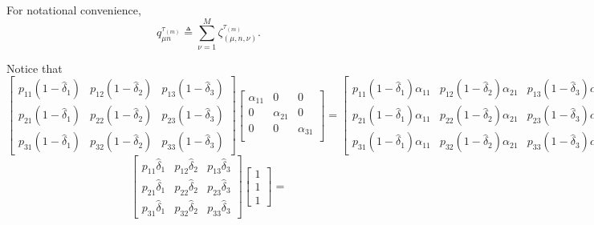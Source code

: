 \documentclass[journal,twoside,web]{ieeecolor}
\begin{document}
\begin{figure*}[ht]
\raggedright
For notational convenience, 
\begin{equation}
    q_{\mu n}^{\tau_{(m)}} \triangleq \sum_{\nu=1}^{M} \zeta_{(\mu,n,\nu)}^{\tau_{(m)}}.
\end{equation}
\end{figure*}
\begin{figure*}[ht]
\raggedright
Notice that 
\begin{equation*}
\begin{bmatrix}
    p_{11}(1-\hat{\delta}_{1}) & p_{12}(1-\hat{\delta}_{2}) & p_{13}(1-\hat{\delta}_{3}) \\
    p_{21}(1-\hat{\delta}_{1}) & p_{22}(1-\hat{\delta}_{2}) & p_{23}(1-\hat{\delta}_{3}) \\
    p_{31}(1-\hat{\delta}_{1}) & p_{32}(1-\hat{\delta}_{2}) & p_{33}(1-\hat{\delta}_{3}) 
\end{bmatrix}
\begin{bmatrix}
    \alpha_{11} & 0 & 0 \\
    0 & \alpha_{21} & 0 \\
    0 & 0 & \alpha_{31} \\
\end{bmatrix}=
\begin{bmatrix}
    p_{11}(1-\hat{\delta}_{1})\alpha_{11} & p_{12}(1-\hat{\delta}_{2})\alpha_{21} & p_{13}(1-\hat{\delta}_{3})\alpha_{31} \\
    p_{21}(1-\hat{\delta}_{1})\alpha_{11} & p_{22}(1-\hat{\delta}_{2})\alpha_{21} & p_{23}(1-\hat{\delta}_{3})\alpha_{31} \\
    p_{31}(1-\hat{\delta}_{1})\alpha_{11} & p_{32}(1-\hat{\delta}_{2})\alpha_{21} & p_{33}(1-\hat{\delta}_{3})\alpha_{31} 
\end{bmatrix}
\end{equation*}
\begin{equation*}
\begin{bmatrix}
    p_{11}\hat{\delta}_{1}  & p_{12}\hat{\delta}_{2}  & p_{13}\hat{\delta}_{3}  \\
    p_{21}\hat{\delta}_{1}  & p_{22}\hat{\delta}_{2}  & p_{23}\hat{\delta}_{3}  \\
    p_{31}\hat{\delta}_{1}  & p_{32}\hat{\delta}_{2}  & p_{33}\hat{\delta}_{3}  
\end{bmatrix}
\begin{bmatrix}
    1 \\ 1 \\ 1
\end{bmatrix} = 

\end{equation*}
\end{figure*}
\end{document}
